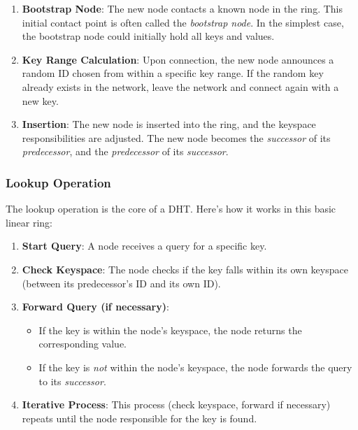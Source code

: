 \begin{enumerate}[itemsep=1pt, topsep=1pt]
    \item \textbf{Bootstrap Node}: The new node contacts a known node in the ring.  This initial contact point is often called the \textit{bootstrap node}.  In the simplest case, the bootstrap node could initially hold all keys and values.

    \item \textbf{Key Range Calculation}: Upon connection, the new node announces a random ID chosen from within a specific key range. If the random key already exists in the network, leave the network and connect again with a new key. 

    \item \textbf{Insertion}: The new node is inserted into the ring, and the keyspace responsibilities are adjusted.  The new node becomes the \textit{successor} of its \textit{predecessor}, and the \textit{predecessor} of its \textit{successor}.
\end{enumerate}

\subsubsection{Lookup Operation}
The lookup operation is the core of a DHT. Here's how it works in this basic linear ring:

\begin{enumerate}[itemsep=1pt, topsep=1pt]
    \item \textbf{Start Query}: A node receives a query for a specific key.

    \item \textbf{Check Keyspace}: The node checks if the key falls within its own keyspace (between its predecessor's ID and its own ID).

    \item \textbf{Forward Query (if necessary)}:
    \begin{itemize}[itemsep=1pt, topsep=1pt]
        \item If the key is within the node's keyspace, the node returns the corresponding value.
        \item If the key is \textit{not} within the node's keyspace, the node forwards the query to its \textit{successor}.
    \end{itemize}

    \item \textbf{Iterative Process}: This process (check keyspace, forward if necessary) repeats until the node responsible for the key is found.
\end{enumerate}


